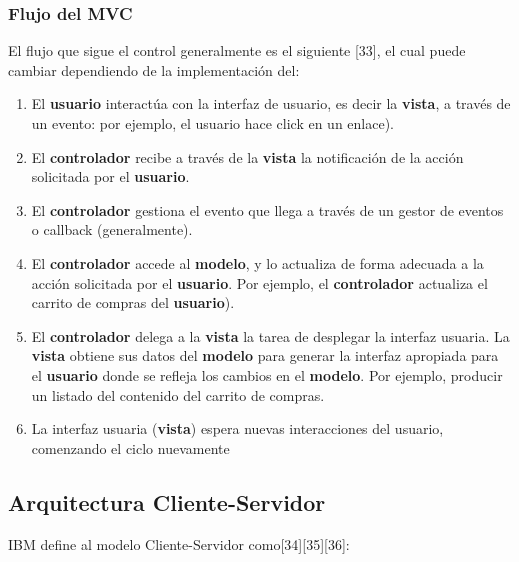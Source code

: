 \subsubsection{Flujo del MVC}

El flujo que sigue el control generalmente es el siguiente [33], el cual puede cambiar dependiendo de la implementación del:

\begin{enumerate}
 \item El \textbf{usuario} interactúa con la interfaz de usuario, es decir la \textbf{vista}, a través de un evento: por ejemplo, 
       el usuario hace click en un enlace).
 
 \item El \textbf{controlador} recibe  a través de la \textbf{vista} la notificación de la acción solicitada por el \textbf{usuario}. 
 
 \item El \textbf{controlador} gestiona el evento que llega a través de un gestor de eventos o callback (generalmente).
 
 \item El \textbf{controlador} accede al \textbf{modelo}, y lo actualiza de forma adecuada a la acción solicitada por el \textbf{usuario}. 
       Por ejemplo, el \textbf{controlador} actualiza el carrito de compras del \textbf{usuario}). 
       
 \item El \textbf{controlador} delega a la \textbf{vista} la tarea de desplegar la interfaz usuaria. La \textbf{vista} obtiene sus datos 
      del \textbf{modelo} para generar la interfaz apropiada para el \textbf{usuario} donde se refleja los cambios en el \textbf{modelo}.
      Por ejemplo, producir un listado del contenido del carrito de compras.
 
 \item La interfaz usuaria (\textbf{vista}) espera nuevas interacciones del usuario, comenzando el ciclo nuevamente

\end{enumerate}



\subsection{Arquitectura Cliente-Servidor}

IBM define al modelo Cliente-Servidor como[34][35][36]: 


